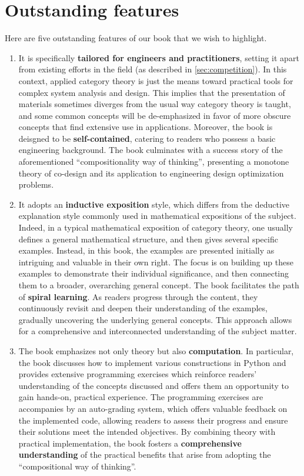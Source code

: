 \documentclass[10pt, article, one side]{memoir}
\begin{document}
    \section{Outstanding features}
    Here are five outstanding features of our book that we wish to highlight.
    \begin{enumerate}
        \item It is specifically \textbf{tailored for engineers and practitioners}, setting it apart from existing efforts in the field (as described in \cref{sec:competition}).
              In this context, applied category theory is just the means toward practical tools for complex system analysis and design.
              This implies that the presentation of materials sometimes diverges from the usual way category theory is taught, and some common concepts will be de-emphasized in favor of more obscure concepts that find extensive use in applications.
              Moreover, the book is deisgned to be \textbf{self-contained}, catering to readers who possess a basic engineering background.
              The book culminates with a success story of the aforementioned “compositionality way of thinking”, presenting a monotone theory of co-design and its application to engineering design optimization problems.
        \item It adopts an \textbf{inductive exposition} style, which differs from the deductive explanation style commonly used in mathematical expositions of the subject.
              Indeed, in a typical mathematical exposition of category theory, one usually defines a general mathematical structure, and then gives several specific examples.
              Instead, in this book, the examples are presented initially as intriguing and valuable in their own right.
              The focus is on building up these examples to demonstrate their individual significance, and then connecting them to a broader, overarching general concept.
              The book facilitates the path of \textbf{spiral learning}.
              As readers progress through the content, they continuously revisit and deepen their understanding of the examples, gradually uncovering the underlying general concepts.
              This approach allows for a comprehensive and interconnected understanding of the subject matter.
        \item The book emphasizes not only theory but also \textbf{computation}. In particular, the book discusses how to implement various constructions in Python and provides extensive programming exercises which reinforce readers' understanding of the concepts discussed and offers them an opportunity to gain hands-on, practical experience. The programming exercises are accompanies by an auto-grading system, which offers valuable feedback on the implemented code, allowing readers to assess their progress and ensure their solutions meet the intended objectives. By combining theory with practical implementation, the book fosters a \textbf{comprehensive understanding} of the practical benefits that arise from adopting the ``compositional way of thinking''.


\end{enumerate}
\end{document}
